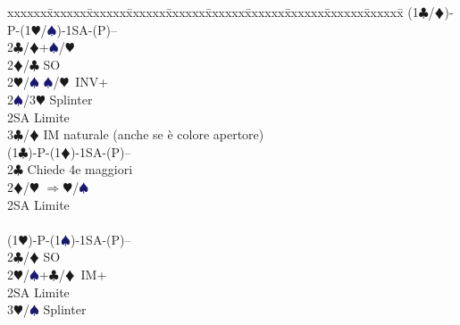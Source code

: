 \documentclass[a4paper,italian]{article}
\newcommand{\BC}{\textcolor{OliveGreen}{$\clubsuit$}}
\newcommand{\BD}{\textcolor{RedOrange}{$\vardiamondsuit$}}
\newcommand{\BH}{\textcolor{Red2}{$\varheartsuit${}}}
\newcommand{\BS}{\textcolor{MidnightBlue}{$\spadesuit${}}}
\newenvironment{bidtable}
{\begin{tabbing}

    xxxxxx\=xxxxxx\=xxxxxx\=xxxxxx\=xxxxxx\=xxxxxx\=xxxxxx\=xxxxxx\=xxxxxx\=xxxxxx\=\kill}
{\end{tabbing} }%
\begin{document}
\begin{multicols}{2}
    \begin{bidtable}
        (1\BC/\BD)-P-(1\BH/\BS)-1SA-(P)--\+\\
        2\BC/\BD{}+\BS/\BH\\
        2\BD/\BC\> SO\\
        2\BH/\BS{} \BS/\BH\ INV+\\
        2\BS/3\BH\> Splinter\\
        2SA\> Limite\\
        3\BC/\BD\> IM naturale (anche se è colore apertore)\-\\
        (1\BC)-P-(1\BD)-1SA-(P)--\+\\
        2\BC\> Chiede 4e maggiori\\
        2\BD/\BH\> $\Rightarrow$\BH/\BS\\
        2SA\> Limite\-\\
        \\
        (1\BH)-P-(1\BS)-1SA-(P)--\+\\
        2\BC/\BD\> SO\\
        2\BH/\BS{}+\BC/\BD\ IM+\\
        2SA\> Limite\\
        3\BH/\BS\> Splinter\\

    \end{bidtable}
    \vfill\null

\end{multicols}
\end{document}
